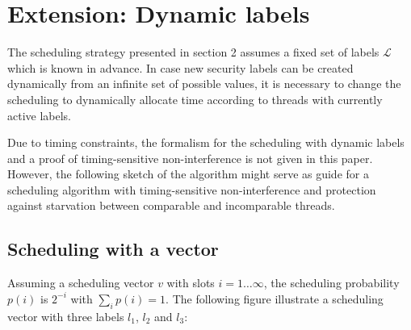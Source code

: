 \documentclass[10pt,preprint]{sigplanconf}
\begin{document}


\section{Extension: Dynamic labels}

The scheduling strategy presented in section 2 assumes a fixed set of labels $\mathcal{L}$ which is known in advance.  In case new security labels can be created dynamically from an infinite set of possible values, it is necessary to change the scheduling to dynamically allocate time according to threads with currently active labels.

Due to timing constraints, the formalism for the scheduling with dynamic labels and a proof of timing-sensitive non-interference is not given in this paper.  However, the following sketch of the algorithm might serve as guide for a scheduling algorithm with timing-sensitive non-interference and protection against starvation between comparable and incomparable threads.

\subsection{Scheduling with a vector}

Assuming a scheduling vector $v$ with slots $i=1 \ldots \infty$, the scheduling probability $p(i)$ is $2^{-i}$ with $\sum_i p(i) = 1$.  The following figure illustrate a scheduling vector with three labels $l_1$, $l_2$ and $l_3$:

\end{document}
